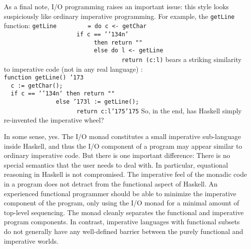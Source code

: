 As a final note, I/O programming raises an important issue: this
style looks suspiciously like ordinary imperative programming.  For
example, the \mbox{\tt getLine} function:
\bprog
\mbox{\tt getLine\ \ \ \ \ \ \ \ \ =\ do\ c\ <-\ getChar}\\
\mbox{\tt \ \ \ \ \ \ \ \ \ \ \ \ \ \ \ \ \ \ \ \ \ if\ c\ ==\ '{\char'134}n'}\\
\mbox{\tt \ \ \ \ \ \ \ \ \ \ \ \ \ \ \ \ \ \ \ \ \ \ \ \ \ \ then\ return\ ""}\\
\mbox{\tt \ \ \ \ \ \ \ \ \ \ \ \ \ \ \ \ \ \ \ \ \ \ \ \ \ \ else\ do\ l\ <-\ getLine}\\
\mbox{\tt \ \ \ \ \ \ \ \ \ \ \ \ \ \ \ \ \ \ \ \ \ \ \ \ \ \ \ \ \ \ \ \ \ \ return\ (c:l)}
\eprog
bears a striking similarity to imperative code (not in any real language) :
\bprog
\mbox{\tt }\\[-8pt]
\mbox{\tt function\ getLine()\ {\char'173}}\\
\mbox{\tt \ \ c\ :=\ getChar();}\\
\mbox{\tt \ \ if\ c\ ==\ `{\char'134}n`\ then\ return\ ""}\\
\mbox{\tt \ \ \ \ \ \ \ \ \ \ \ \ \ \ \ else\ {\char'173}l\ :=\ getLine();}\\
\mbox{\tt \ \ \ \ \ \ \ \ \ \ \ \ \ \ \ \ \ \ \ \ \ return\ c:l{\char'175}{\char'175}}
\eprog
So, in the end, has Haskell simply re-invented the imperative wheel?

In some sense, yes.  The I/O monad constitutes a small imperative
sub-language inside Haskell, and thus the I/O component of a program
may appear similar to ordinary imperative code.  But there is one
important difference: There is no special semantics that the user
needs to deal with.  In particular, equational reasoning in Haskell is
not compromised.  The imperative feel of the monadic code in a program
does not detract from the functional aspect of Haskell.  An
experienced functional programmer should be able to minimize the
imperative component of the program, only using the I/O monad for a
minimal amount of top-level sequencing.  The
monad cleanly separates the functional and imperative
program components.  In contrast, imperative languages with functional
subsets do not generally have any well-defined barrier between the
purely functional and imperative worlds.




